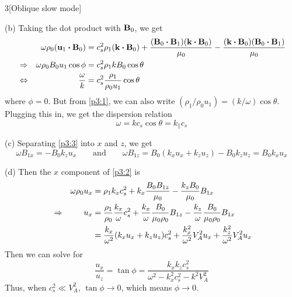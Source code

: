 \documentclass[12pt]{article}
\begin{document}
\begin{problem}{3}[Oblique slow mode]
\begin{solution}
(b) Taking the dot product with $\vb{B}_0$, we get
\begin{align}
    &&\omega\rho_0(\vb{u}_1\vdot\vb{B}_0)
    &=c_s^2\rho_1(\vb{k}\vdot\vb{B}_0)+\frac{(\vb{B}_0\vdot\vb{B}_1)(\vb{k}\vdot\vb{B}_0)}{\mu_0}
    -\frac{(\vb{k}\vdot\vb{B}_0)(\vb{B}_0\vdot\vb{B}_1)}{\mu_0}\notag\\
    &\Rightarrow& \omega\rho_0B_0u_1\cos\phi&=c_s^2\rho_1kB_0\cos\theta\notag\\
    &\Leftrightarrow&\frac{\omega}{k}&=c_s^2\frac{\rho_1}{\rho_0u_1}\cos\theta
\end{align}
where $\phi=0$. But from \eqref{p3:1}, we can also write $(\rho_1/\rho_0u_1)=(k/
\omega)\cos\theta$. Plugging this in, we get the dispersion relation
\begin{equation}
    \omega=kc_s\cos\theta=k_\|c_s
\end{equation}

(c) Separating \eqref{p3:3} into $x$ and $z$, we get
\begin{equation}
    \omega B_{1x}=-B_0k_zu_x\qquad\text{and}\qquad
    \omega B_{1z}=B_0(k_xu_x+k_zu_z)-B_0k_zu_z=B_0k_xu_x
\end{equation}

(d) Then the $x$ component of \eqref{p3:2} is
\begin{align}
    &&\omega\rho_0u_x
    &=\rho_1k_xc_s^2+k_x\frac{B_0B_{1z}}{\mu_0}-\frac{k_zB_0}{\mu_0}B_{1x}\notag\\
    &\Rightarrow&
    u_x&=\frac{\rho_1}{\rho_0}\frac{k_x}{\omega}c_s^2+\frac{k_x}{\omega}\frac{B_0}{\mu_0\rho_0}B_{1z}-\frac{k_z}{\omega}\frac{B_0}{\mu_0\rho_0}B_{1x}\notag\\
       &&
       &=\frac{k_x}{\omega^2}(k_xu_x+k_zu_z)c_s^2+\frac{k_x^2}{\omega^2}V_A^2u_x+\frac{k_z^2}{\omega^2}V_A^2u_x
\end{align}
Then we can solve for
\begin{equation}
    \frac{u_x}{u_z}=\tan\phi=\frac{k_xk_zc_s^2}{\omega^2-k_x^2c_s^2-k^2V_A^2} 
\end{equation}
Thus, when $c_s^2\ll V_A^2$, $\tan\phi\to0$, which means $\phi\to0$.
\end{solution}
\end{problem}
\end{document}
